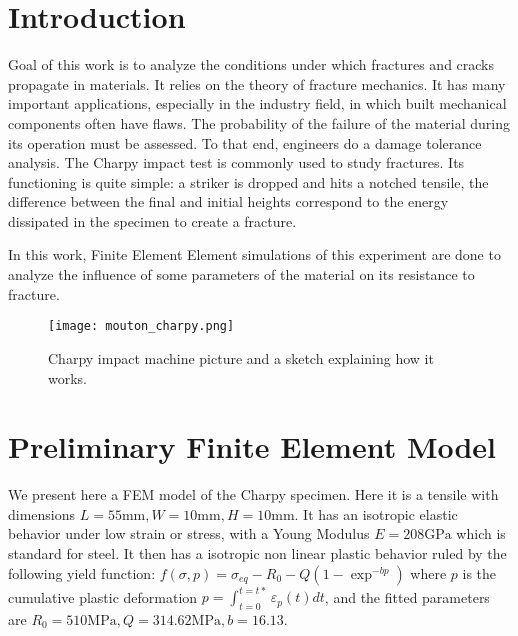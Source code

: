 \documentclass[
10pt, %
a4paper, %
oneside, %
headinclude,footinclude, %
BCOR5mm, %
]{scrartcl}
\begin{document}
\newpage %


\section{Introduction}
Goal of this work is to analyze the conditions under which fractures
and cracks propagate in materials. It relies on the theory of fracture mechanics.
It has many important applications, especially in the industry field,
in which built mechanical components often have flaws.
The probability of the failure of the material during
its operation must be assessed.
To that end, engineers do a damage tolerance analysis.
The Charpy impact test is commonly used to study fractures.
Its functioning is quite simple: a striker is dropped and hits a
notched tensile, the difference between the final and initial heights
correspond to the energy dissipated in the specimen to create a fracture.

In this work, Finite Element Element simulations of this
experiment are done to analyze
the influence of some parameters of the material on its resistance
to fracture.

\begin{figure}[H]
    \centering
    \texttt{[image: mouton\_charpy.png]}
    \caption{Charpy impact machine picture and a sketch explaining how it works.}
\end{figure}

\section{Preliminary Finite Element Model}

We present here a FEM model of the Charpy specimen.
Here it is a tensile with dimensions $L=55 \text{mm}, W = 10 \text{mm}, H = 10 \text{mm}$.
It has an
isotropic elastic behavior under low strain or stress, with a
Young Modulus $E=208 \text{GPa}$ which is standard for steel.
It then has a isotropic non linear plastic behavior ruled by the following yield
function:
$ f(\sigma, p) = \sigma_{eq} - R_0 - Q(1 - \exp^{-bp}) $ where $p$ is the cumulative
plastic deformation $\displaystyle p = \int_{t=0}^{t=t*}\varepsilon_{p}(t)dt$,
and the fitted parameters are $R_0=510 \text{MPa}, Q = 314.62 \text{MPa}, b = 16.13$.
\end{document}
